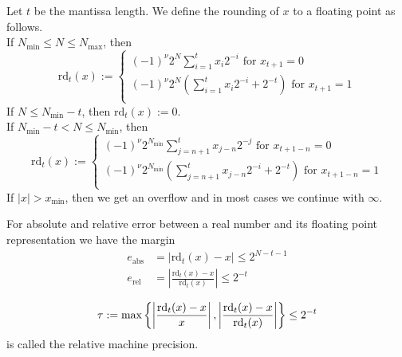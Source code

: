 \begin{definition} \label{theo:round}
    Let \(t\) be the mantissa length. We define the rounding of \(x\) to a floating point as follows. \\
    If \(N_{\text{min}} \leq N \leq N_{\text{max}}\), then
    \begin{equation*}
        \text{rd}_t(x) :=
        \begin{cases}
            (-1)^{\nu} 2^N \sum_{i = 1}^{t}x_i 2^{-i} \text{ for } x_{t+1} = 0 \\
            (-1)^{\nu} 2^N (\sum_{i = 1}^{t}x_i 2^{-i} + 2^{-t}) \text{ for } x_{t+1} = 1 \\
        \end{cases}
    \end{equation*}
    If \(N \leq N_{\text{min}} - t\), then \(\text{rd}_t(x) := 0\). \\
    If \(N_{\text{min}} - t < N \leq N_{\text{min}}\), then
    \begin{equation*}
        \text{rd}_t(x) :=
        \begin{cases}
            (-1)^{\nu} 2^{N_{\text{min}}} \sum_{j = n + 1}^{t}x_{j-n} 2^{-j} \text{ for } x_{t+1-n} = 0 \\
            (-1)^{\nu} 2^{N_{\text{min}}} (\sum_{j = n + 1}^{t}x_{j-n} 2^{-i} + 2^{-t}) \text{ for } x_{t+1-n} = 1 \\
        \end{cases}
    \end{equation*}
    If \(|x| > x_{\text{min}}\), then we get an overflow and in most cases we continue with \(\infty\).  \cite{bib:rabus}
\end{definition}
%
\begin{lemma} \label{theo:margin}
    For absolute and relative error between a real number and its floating point representation we have the margin  \cite{bib:rabus}
    \begin{align*}
        e_{\text{abs}} &= | \text{rd}_t(x) - x | \leq 2^{N - t - 1} \\
        e_{\text{rel}} &= \left| \frac{\text{rd}_t(x) - x}{\text{rd}_t(x)} \right| \leq 2^{-t}
    \end{align*}
\end{lemma}
%
\begin{definition}
    \begin{equation*}
        \tau := \text{max} \left\{ \left| \frac{\text{rd}_t(x) - x}{x}\right|, \left| \frac{\text{rd}_t(x) - x}{\text{rd}_t(x)} \right| \right\} \leq 2^{-t} \\
    \end{equation*}
    is called the relative machine precision.  \cite{bib:rabus}
\end{definition}

